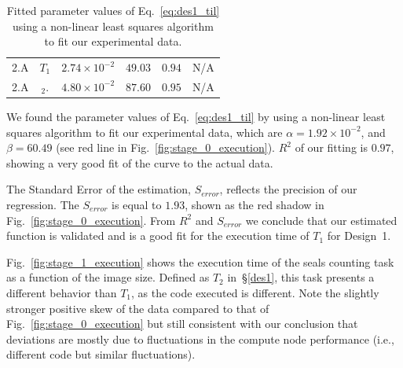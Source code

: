\begin{table}[t]
\begin{tabular}{@{}cclrcl@{}}
        2.A                                            &
        $T_{1}$                                        &
        $2.74\times 10^{-2}$                           &
        $49.03$                                        &
        $0.94$                                         &
        N/A     \\
        2.A                                            &
        $_{2}$.                                        &
        $4.80\times 10^{-2}$                           &
        $87.60$                                        &
        $0.95$                                         &
        N/A   \\
		\bottomrule
    \end{tabular}
    \caption{Fitted parameter values of Eq.~\ref{eq:des1_til} using a
             non-linear least squares algorithm to fit our experimental
             data.}\label{tab:fit_par_val}
\end{table}

We found the parameter values of Eq.~\ref{eq:des1_til} by using a non-linear least squares algorithm to fit our experimental data, which are $\alpha= 1.92 \times 10^{-2}$, and $\beta = 60.49$ (see red line in Fig.~\ref{fig:stage_0_execution}).
$R^{2}$ of our fitting is $0.97$, showing a very good fit of the curve to the actual data.

The Standard Error of the estimation, $S_{error}$, reflects the precision of our regression.
The $S_{error}$ is equal to $1.93$, shown as the red shadow in Fig.~\ref{fig:stage_0_execution}.
From $R^{2}$ and $S_{error}$ we conclude that our estimated function is validated and is a good fit for the execution time of $T_{1}$ for Design~1.


Fig.~\ref{fig:stage_1_execution} shows the execution time of the seals counting task as a function of the image size.
Defined as $T_{2}$ in~\S\ref{des1}, this task presents a different behavior than $T_{1}$, as the code executed is different.
Note the slightly stronger positive skew of the data compared to that of Fig.~\ref{fig:stage_0_execution} but still consistent with our conclusion that deviations are mostly due to fluctuations in the compute node performance (i.e., different code but similar fluctuations).

